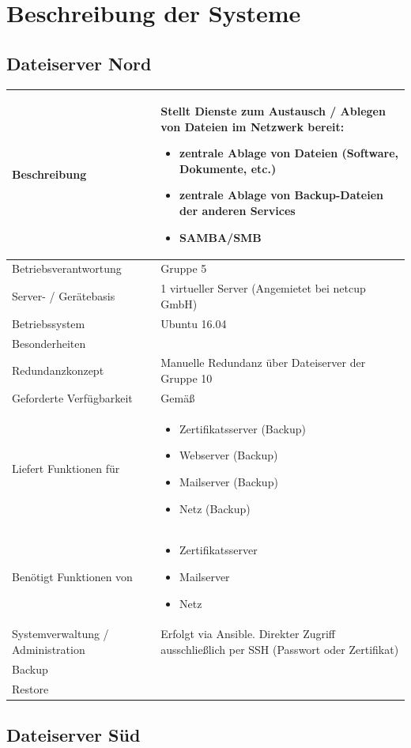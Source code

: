 \documentclass[]{article}
\date{}
\begin{document}
\section{Beschreibung der Systeme}\label{beschreibung-der-systeme}

\subsection{Dateiserver Nord}\label{dateiserver-nord}

\begin{longtable}{|l|p{6cm}|}
\toprule
Beschreibung & Stellt Dienste zum Austausch / Ablegen von Dateien im
Netzwerk bereit:

\begin{itemize}
\item
  zentrale Ablage von Dateien (Software, Dokumente, etc.)
\item
  zentrale Ablage von Backup-Dateien der anderen Services
\item
  SAMBA/SMB
\end{itemize}\tabularnewline
\midrule
Betriebsverantwortung & Gruppe 5\tabularnewline
Server- / Gerätebasis & 1 virtueller Server (Angemietet bei netcup
GmbH)\tabularnewline
Betriebssystem & Ubuntu 16.04\tabularnewline
Besonderheiten &\tabularnewline
Redundanzkonzept & Manuelle Redundanz über Dateiserver der Gruppe
10\tabularnewline
Geforderte Verfügbarkeit & Gemäß\tabularnewline
Liefert Funktionen für & \begin{itemize}
\item
  Zertifikatsserver (Backup)
\item
  Webserver (Backup)
\item
  Mailserver (Backup)
\item
  Netz (Backup)
\end{itemize}\tabularnewline
Benötigt Funktionen von & \begin{itemize}
\item
  Zertifikatsserver
\item
  Mailserver
\item
  Netz
\end{itemize}\tabularnewline
Systemverwaltung / Administration & Erfolgt via Ansible. Direkter Zugriff ausschließlich per SSH (Passwort oder Zertifikat)\tabularnewline
Backup &\tabularnewline
Restore &\tabularnewline
\bottomrule
\end{longtable}

\newpage

\subsection{Dateiserver Süd}\label{dateiserver-suxfcd}
\end{document}
